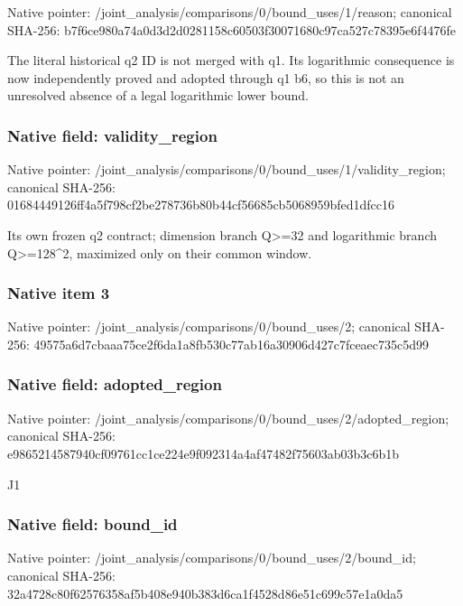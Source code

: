 \documentclass[10pt,a4paper]{article}
\begin{document}
Native pointer: /joint\_analysis/comparis\allowbreak{}ons/0/bound\_uses/1/reaso\allowbreak{}n; canonical SHA-256: b7f6ce980a74a0d3d2d02811\allowbreak{}58c60503f30071680c97ca52\allowbreak{}7c78395e6f4476fe


The literal historical q2 ID is not merged with q1. Its logarithmic consequence is now independently proved and adopted through q1 b6, so this is not an unresolved absence of a legal logarithmic lower bound.


\subsubsection{Native field: validity\_region}


Native pointer: /joint\_analysis/comparis\allowbreak{}ons/0/bound\_uses/1/valid\allowbreak{}ity\_region; canonical SHA-256: 01684449126ff4a5f798cf2b\allowbreak{}e278736b80b44cf56685cb50\allowbreak{}68959bfed1dfcc16


Its own frozen q2 contract; dimension branch Q>=32 and logarithmic branch Q>=128\textasciicircum{}2, maximized only on their common window.


\subsubsection{Native item 3}


Native pointer: /joint\_analysis/comparis\allowbreak{}ons/0/bound\_uses/2; canonical SHA-256: 49575a6d7cbaaa75ce2f6da1\allowbreak{}a8fb530c77ab16a30906d427\allowbreak{}c7fceaec735c5d99



\subsubsection{Native field: adopted\_region}


Native pointer: /joint\_analysis/comparis\allowbreak{}ons/0/bound\_uses/2/adopt\allowbreak{}ed\_region; canonical SHA-256: e9865214587940cf09761cc1\allowbreak{}ce224e9f092314a4af47482f\allowbreak{}75603ab03b3c6b1b


J1


\subsubsection{Native field: bound\_id}


Native pointer: /joint\_analysis/comparis\allowbreak{}ons/0/bound\_uses/2/bound\allowbreak{}\_id; canonical SHA-256: 32a4728c80f62576358af5b4\allowbreak{}08e940b383d6ca1f4528d86e\allowbreak{}51c699c57e1a0da5
\end{document}
